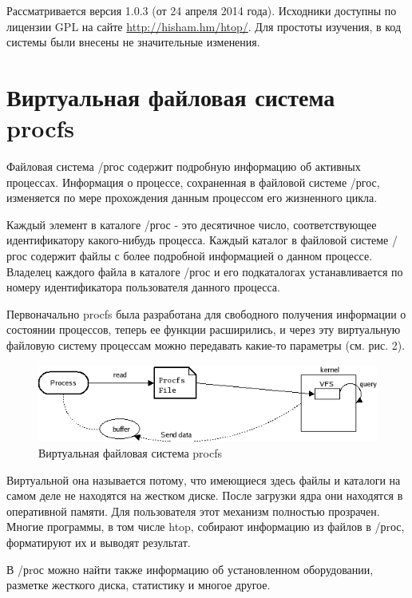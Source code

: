 \documentclass[a4paper, 12pt]{article}		%
\begin{document}
Рассматривается версия 1.0.3 (от 24 апреля 2014 года). Исходники доступны по лицензии GPL на сайте \url{http://hisham.hm/htop/}. Для простоты изучения, в код системы были внесены не значительные изменения.

\newpage
\section{Виртуальная файловая система procfs}

Файловая система /ргос содержит подробную информацию об активных процессах. Информация о процессе, сохраненная в файловой системе /ргос, изменяется по мере прохождения данным процессом его жизненного цикла.

Каждый элемент в каталоге /ргос - это десятичное число, соответствующее идентификатору какого-нибудь процесса. Каждый каталог в файловой системе /ргос содержит файлы с более подробной информацией о данном процессе. Владелец каждого файла в каталоге /ргос и его подкаталогах устанавливается по номеру идентификатора пользователя данного процесса.

Первоначально procfs была разработана для свободного получения  информации о состоянии процессов, теперь ее функции расширились, и через эту виртуальную файловую систему процессам можно передавать какие-то параметры (см. рис. 2).

\begin{figure}[h!]
\centering
\includegraphics[scale=0.9]{res/ProcessFileSystem}
\caption{Виртуальная файловая система procfs}
\end{figure}

Виртуальной она называется потому, что имеющиеся здесь файлы и каталоги на самом деле не находятся на жестком диске. После загрузки ядра они находятся в оперативной памяти. Для пользователя этот механизм полностью  прозрачен. Многие программы, в  том числе htop, собирают информацию из  файлов  в  /рrос, форматируют их и выводят результат.

В /рrос можно найти  также  информацию об установленном оборудовании,  разметке  жесткого диска, статистику и  многое другое.
\end{document}
